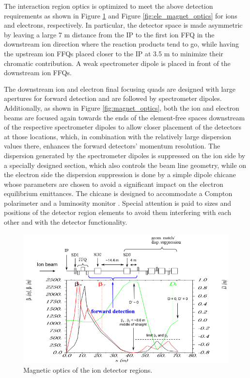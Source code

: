 The interaction region optics is optimized to meet the above detection requirements as shown in Figure \ref{fig:ion_magnet_optics} and Figure \ref{fig:ele_magnet_optics} for ions and electrons, respectively. In particular, the detector space is made asymmetric by leaving a large 7 m distance from the IP to the first ion FFQ in the downstream ion direction where the reaction products tend to go, while having the upstream ion FFQs placed closer to the IP at 3.5 m to minimize their chromatic contribution. A weak spectrometer dipole is placed in front of the downstream ion FFQs.

The downstream ion and electron final focusing quads are designed with large apertures for forward detection and are followed by spectrometer dipoles. Additionally, as shown in Figure \ref{fig:magnet_optics}, both the ion and electron beams are focused again towards the ends of the element-free spaces downstream of the respective spectrometer dipoles to allow closer placement of the detectors at those locations, which, in combination with the relatively large dispersion values there, enhances the forward detectors’ momentum resolution. The dispersion generated by the spectrometer dipoles is suppressed on the ion side by a specially designed section, which also controls the beam line geometry, while on the electron side the dispersion suppression is done by a simple dipole chicane whose parameters are chosen to avoid a significant impact on the electron equilibrium emittances. The chicane is designed to accommodate a Compton polarimeter and a luminosity monitor \cite{Morozov:2014}.  Special attention is paid to sizes and positions of the detector region elements to avoid them interfering with each other and with the detector functionality. 

\begin{figure}[!htb]
	\centering
	\includegraphics[width=.75\textwidth]{../../img/ion_magnet_optics}
	\caption{Magnetic optics of the ion detector regions.}
	\label{fig:ion_magnet_optics}
\end{figure}

